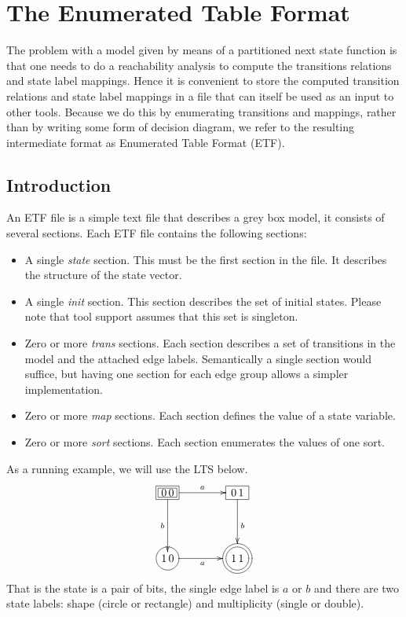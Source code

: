 \chapter{The Enumerated Table Format}


The problem with a model given by means of a partitioned
next state function is that one needs to do a reachability analysis to
compute the transitions relations and state label mappings.
Hence it is convenient to store the computed transition relations
and state label mappings in a file that can itself be
used as an input to other tools. Because we do this by enumerating
transitions and mappings, rather than by writing  some
form of decision diagram, we refer to the resulting intermediate
format as Enumerated Table Format (ETF).

\section{Introduction}

An ETF file is a simple text file that describes a grey box model,
it consists of several sections. Each ETF file contains the following sections:
\begin{itemize}
\item A single {\em state} section. This must be the first section in the file.
It describes the structure of the state vector.
\item A single {\em init} section. This section describes the set of initial states.
Please note that tool support assumes that this set is singleton.
\item Zero or more {\em trans} sections. Each section describes a set of transitions
in the model and the attached edge labels. Semantically a single section would suffice,
but having one section for each edge group allows a simpler implementation.
\item Zero or more {\em map} sections. Each section defines the value of a state variable.
\item Zero or more {\em sort} sections. Each section enumerates the values of one sort.
\end{itemize}

As a running example, we will use the LTS below.
\[
{\xymatrix@=4em{
*+[F=]{\,0\,0\,} \ar@{->}[r]^a\ar@{->}[d]_b
&
*+[F]{\,0\,1\,} \ar@{->}[d]^b
\\
*+[Fo]{\,1\,0\,} \ar@{->}[r]_a
&
*+[Fo]+=+[Fo]{\,1\,1\,}
}}
\]
That is the state is a pair of bits, the single edge label is $a$ or $b$ and there are
two state labels: shape (circle or rectangle) and multiplicity (single or double).

